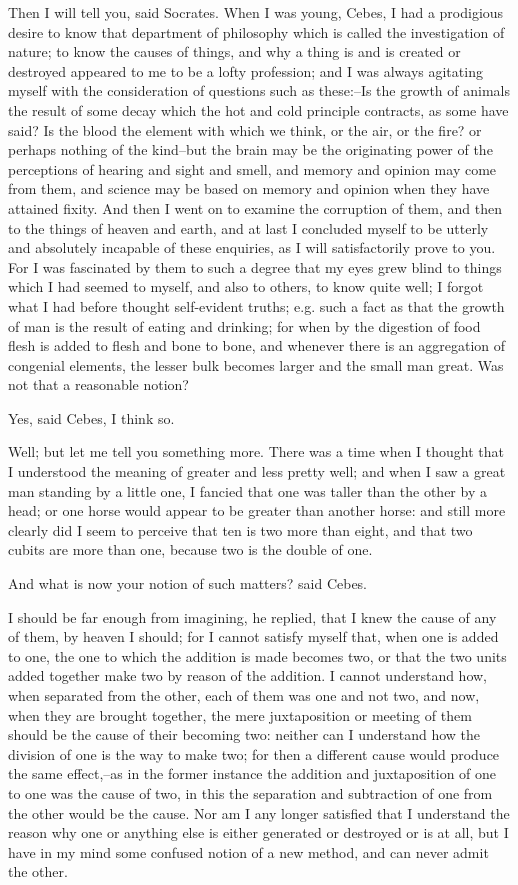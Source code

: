 Then I will tell you, said Socrates. When I was young, Cebes, I had a
prodigious desire to know that department of philosophy which is called
the investigation of nature; to know the causes of things, and why
a thing is and is created or destroyed appeared to me to be a lofty
profession; and I was always agitating myself with the consideration of
questions such as these:--Is the growth of animals the result of some
decay which the hot and cold principle contracts, as some have said? Is
the blood the element with which we think, or the air, or the fire? or
perhaps nothing of the kind--but the brain may be the originating
power of the perceptions of hearing and sight and smell, and memory
and opinion may come from them, and science may be based on memory and
opinion when they have attained fixity. And then I went on to examine
the corruption of them, and then to the things of heaven and earth, and
at last I concluded myself to be utterly and absolutely incapable
of these enquiries, as I will satisfactorily prove to you. For I was
fascinated by them to such a degree that my eyes grew blind to things
which I had seemed to myself, and also to others, to know quite well; I
forgot what I had before thought self-evident truths; e.g. such a fact
as that the growth of man is the result of eating and drinking; for when
by the digestion of food flesh is added to flesh and bone to bone, and
whenever there is an aggregation of congenial elements, the lesser
bulk becomes larger and the small man great. Was not that a reasonable
notion?

Yes, said Cebes, I think so.

Well; but let me tell you something more. There was a time when I
thought that I understood the meaning of greater and less pretty well;
and when I saw a great man standing by a little one, I fancied that one
was taller than the other by a head; or one horse would appear to
be greater than another horse: and still more clearly did I seem to
perceive that ten is two more than eight, and that two cubits are more
than one, because two is the double of one.

And what is now your notion of such matters? said Cebes.

I should be far enough from imagining, he replied, that I knew the cause
of any of them, by heaven I should; for I cannot satisfy myself that,
when one is added to one, the one to which the addition is made becomes
two, or that the two units added together make two by reason of the
addition. I cannot understand how, when separated from the other, each
of them was one and not two, and now, when they are brought together,
the mere juxtaposition or meeting of them should be the cause of their
becoming two: neither can I understand how the division of one is the
way to make two; for then a different cause would produce the same
effect,--as in the former instance the addition and juxtaposition of one
to one was the cause of two, in this the separation and subtraction of
one from the other would be the cause. Nor am I any longer satisfied
that I understand the reason why one or anything else is either
generated or destroyed or is at all, but I have in my mind some confused
notion of a new method, and can never admit the other.

